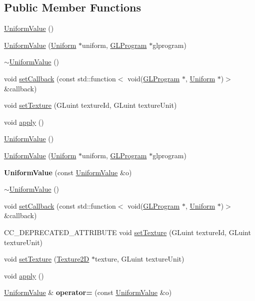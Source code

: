 \subsection*{Public Member Functions}
\begin{DoxyCompactItemize}
\item 
\hyperlink{classUniformValue_a981f70651e0d28ab7bad561370bd5864}{Uniform\+Value} ()
\item 
\hyperlink{classUniformValue_a3abad7ce21beca7b12cd8c242b2129d5}{Uniform\+Value} (\hyperlink{structUniform}{Uniform} $\ast$uniform, \hyperlink{classGLProgram}{G\+L\+Program} $\ast$glprogram)
\item 
\hyperlink{classUniformValue_a85225518894b909a58e7f53715de9419}{$\sim$\+Uniform\+Value} ()
\item 
void \hyperlink{classUniformValue_a3f66bee36e75da9d276b0f99bd137670}{set\+Callback} (const std\+::function$<$ void(\hyperlink{classGLProgram}{G\+L\+Program} $\ast$, \hyperlink{structUniform}{Uniform} $\ast$)$>$ \&callback)
\item 
void \hyperlink{classUniformValue_a2782110b6651c0e201e6a7c85416f58b}{set\+Texture} (G\+Luint texture\+Id, G\+Luint texture\+Unit)
\item 
void \hyperlink{classUniformValue_a2e29cd1f5bd246b2296cb40a60c3adca}{apply} ()
\item 
\hyperlink{classUniformValue_a981f70651e0d28ab7bad561370bd5864}{Uniform\+Value} ()
\item 
\hyperlink{classUniformValue_a3abad7ce21beca7b12cd8c242b2129d5}{Uniform\+Value} (\hyperlink{structUniform}{Uniform} $\ast$uniform, \hyperlink{classGLProgram}{G\+L\+Program} $\ast$glprogram)
\item 
\mbox{\label{classUniformValue_aff108c85b20b892ba01e350ad532a3bb}} 
{\bfseries Uniform\+Value} (const \hyperlink{classUniformValue}{Uniform\+Value} \&o)
\item 
\hyperlink{classUniformValue_a85225518894b909a58e7f53715de9419}{$\sim$\+Uniform\+Value} ()
\item 
void \hyperlink{classUniformValue_a3f66bee36e75da9d276b0f99bd137670}{set\+Callback} (const std\+::function$<$ void(\hyperlink{classGLProgram}{G\+L\+Program} $\ast$, \hyperlink{structUniform}{Uniform} $\ast$)$>$ \&callback)
\item 
C\+C\+\_\+\+D\+E\+P\+R\+E\+C\+A\+T\+E\+D\+\_\+\+A\+T\+T\+R\+I\+B\+U\+TE void \hyperlink{classUniformValue_ad8c2b6a8a18332ac20051e29a4ac72c6}{set\+Texture} (G\+Luint texture\+Id, G\+Luint texture\+Unit)
\item 
void \hyperlink{classUniformValue_ad55812685ddc1cc858ada0cf5fe2afaf}{set\+Texture} (\hyperlink{classTexture2D}{Texture2D} $\ast$texture, G\+Luint texture\+Unit)
\item 
void \hyperlink{classUniformValue_a2e29cd1f5bd246b2296cb40a60c3adca}{apply} ()
\item 
\mbox{\label{classUniformValue_a01922e556e68689199d8cf4b815c469e}} 
\hyperlink{classUniformValue}{Uniform\+Value} \& {\bfseries operator=} (const \hyperlink{classUniformValue}{Uniform\+Value} \&o)
\end{DoxyCompactItemize}
